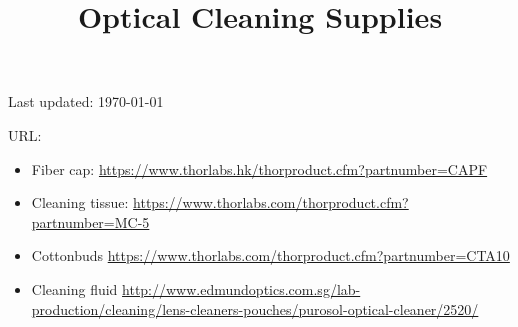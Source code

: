 \documentclass{article}
\title{\vspace{-4cm}Optical Cleaning Supplies}
\date{}
\begin{document}
\maketitle

\vspace{-1cm}

Last updated: \today

URL:

\begin{itemize}
  \item Fiber cap: \url{https://www.thorlabs.hk/thorproduct.cfm?partnumber=CAPF}
  \item Cleaning tissue: \url{https://www.thorlabs.com/thorproduct.cfm?partnumber=MC-5}
  \item Cottonbuds \url{https://www.thorlabs.com/thorproduct.cfm?partnumber=CTA10}
  \item Cleaning fluid \url{http://www.edmundoptics.com.sg/lab-production/cleaning/lens-cleaners-pouches/purosol-optical-cleaner/2520/}
\end{itemize}
\end{document}
